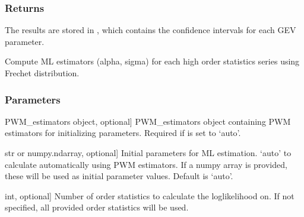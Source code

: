 \documentclass[a4paper,11pt,openany,english]{sphinxmanual}
\begin{document}
\begin{fulllineitems}
\begin{fulllineitems}
\subsubsection{Returns}
\label{\detokenize{api_topt:id71}}\begin{description}
\sphinxAtStartPar
The results are stored in , which contains the confidence intervals for each GEV parameter.

\end{description}

\end{fulllineitems}


\begin{fulllineitems}
\label{\detokenize{api_topt:xtremes.topt.Frechet_ML_estimators.get_ML_estimation}}
\pysigstartsignatures
{}
\pysigstopsignatures
\sphinxAtStartPar
Compute ML estimators (alpha, sigma) for each high order statistics series using Frechet distribution.


\subsubsection{Parameters}
\label{\detokenize{api_topt:id72}}\begin{description}
\sphinxlineitem{PWM\_estimators}{[}PWM\_estimators object, optional{]}
\sphinxAtStartPar
PWM\_estimators object containing PWM estimators for initializing parameters. Required if  
is set to ‘auto’.

\sphinxlineitem{initParams}{[}str or numpy.ndarray, optional{]}
\sphinxAtStartPar
Initial parameters for ML estimation. ‘auto’ to calculate automatically using PWM estimators.
If a numpy array is provided, these will be used as initial parameter values. Default is ‘auto’.

\sphinxlineitem{r}{[}int, optional{]}
\sphinxAtStartPar
Number of order statistics to calculate the log\sphinxhyphen{}likelihood on. If not specified, all provided order 
statistics will be used.


\end{description}
\end{fulllineitems}
\end{fulllineitems}
\end{document}
